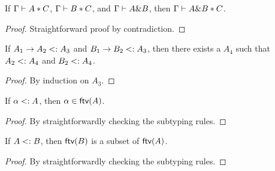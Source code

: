 \begin{theorem}
  \label{theorem:disjoint-intersect}

  If $\Gamma \vdash A * C$, $\Gamma \vdash B * C$, and $\Gamma \vdash A \& B$,
  then $\Gamma \vdash A \& B * C$.
\end{theorem}

\begin{proof}
  Straightforward proof by contradiction.
\end{proof}

\begin{lemma}
  \label{lemma:common-supertype}

  If $A_1 \to A_2 <: A_3$ and $B_1 \to B_2 <: A_3$,
  then there exists a $A_4$ such that $A_2 <: A_4$ and $B_2 <: A_4$.
\end{lemma}

\begin{proof}
  By induction on $A_3$.
\end{proof}

\begin{lemma}
  \label{lemma:subtype-ftv-var}

  If $\alpha <: A$, then $\alpha \in \textsf{ftv}(A)$.
\end{lemma}

\begin{proof}
  By straightforwardly checking the subtyping rules.
\end{proof}

\begin{lemma}
  \label{lemma:subtype-ftv}

  If $A <: B$, then $\textsf{ftv}(B)$ is a subset of $\textsf{ftv}(A)$.
\end{lemma}

\begin{proof}
  By straightforwardly checking the subtyping rules.
\end{proof}

\algodissoundness*

